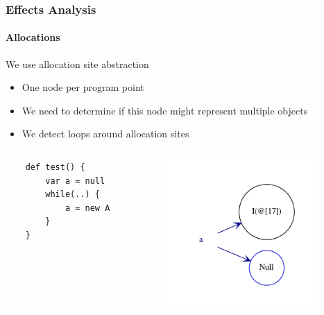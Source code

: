 \documentclass[hyperref={pdfpagelabels=false}]{beamer}
\begin{document}
\begin{frame}[fragile]
    \frametitle{Effects Analysis}
    \framesubtitle{Allocations}
    We use allocation site abstraction
        \begin{itemize}
            \item One node per program point
            \item We need to determine if this node might represent multiple
                objects
            \item We detect loops around allocation sites
        \end{itemize}
    \begin{columns}
      \begin{column}{0.3\textwidth}
\begin{lstlisting}
    def test() {
        var a = null
        while(..) {
            a = new A
        }
    }
\end{lstlisting}
      \end{column}
      \begin{column}{0.7\textwidth}
        \includegraphics[width=60mm]{images/alloc.pdf}
      \end{column}
    \end{columns}
\end{frame}
\end{document}
